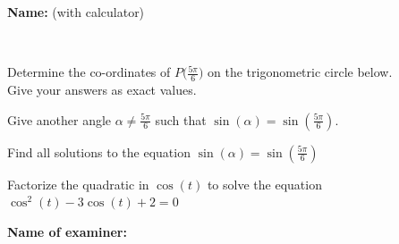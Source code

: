 \documentclass[8pt]{exam}
\begin{document}
\textbf{Name:} \dotfill (with calculator)

\



\begin{questions}


\question[2] 
Determine the co-ordinates of $P\big(\frac{5\pi}{6}\big)$ on the trigonometric circle below. \\ 
Give your answers as exact values.

\vspace{-5mm}
\begin{minipage}[t]{0.5\textwidth}
\fillwithdottedlines{42mm}
\end{minipage}
\begin{minipage}[t]{0.5\textwidth}
\vspace{0mm}
\begin{center}
\end{center}
\end{minipage}

\vspace{-5mm}
\question[1] Give another angle $\alpha \neq \frac{5\pi}{6}$ such that $\sin(\alpha) = \sin(\frac{5\pi}{6})$.
\fillwithdottedlines{35mm}

\question[2] Find all solutions to the equation $\sin(\alpha) = \sin(\frac{5\pi}{6})$
\fillwithdottedlines{35mm}

\question[2] Factorize the quadratic in $\cos(t)$ to solve the equation $\cos^2(t) - 3\cos(t) + 2 = 0$ 
\fillwithdottedlines{35mm}




\vfill

\end{questions}

\begin{tcolorbox}

\textbf{Name of examiner:}

\begin{center}
\gradetable[h][questions]
\end{center}

\end{tcolorbox}
\end{document}
